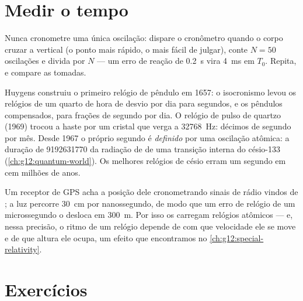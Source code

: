 \section{Medir o tempo}

\begin{method}\label{met:g12:oscillators-and-time:timing}
Nunca cronometre uma única oscilação: dispare o cronômetro quando o corpo cruzar a
vertical (o ponto mais rápido, o mais fácil de julgar), conte $N = 50$ oscilações e
divida por $N$ --- um erro de reação de \qty{0.2}{s} vira \qty{4}{ms} em $T_0$.
Repita, e compare as tomadas.
\end{method}

\begin{example}\label{ex:g12:oscillators-and-time:clocks}
Huygens construiu o primeiro relógio de pêndulo em \num{1657}: o isocronismo levou os
relógios de um quarto de hora de desvio por dia para segundos, e os pêndulos
compensados, para frações de segundo por dia. O relógio de pulso de quartzo
(\num{1969}) trocou a haste por um cristal que verga a \qty{32768}{Hz}: décimos de
segundo por mês. Desde \num{1967} o próprio segundo é \emph{definido} por uma oscilação
atômica: a duração de \num{9192631770}  da radiação de  de uma
transição interna do césio-133 (\cref{ch:g12:quantum-world}). Os melhores relógios de
césio erram um segundo em cem milhões de anos.
\end{example}

\begin{remark}\label{rem:g12:oscillators-and-time:gps}
Um receptor de GPS acha a posição dele cronometrando sinais de rádio vindos de
; a luz percorre \qty{30}{cm} por nanossegundo, de modo que um erro de relógio
de um microssegundo o desloca em \qty{300}{m}. Por isso os  carregam relógios
atômicos --- e, nessa precisão, o ritmo de um relógio depende de com que velocidade ele
se move e de que altura ele ocupa, um efeito que encontramos no
\cref{ch:g12:special-relativity}.
\end{remark}

\section{Exercícios}

